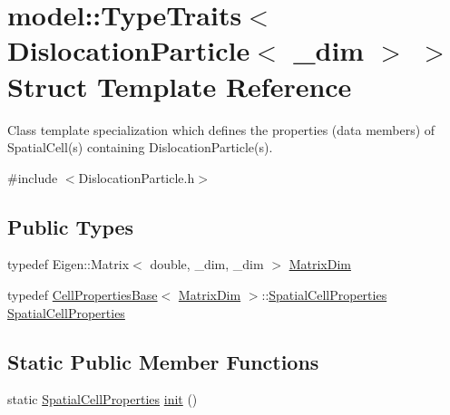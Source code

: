 \hypertarget{structmodel_1_1_type_traits_3_01_dislocation_particle_3_01__dim_01_4_01_4}{}\section{model\+:\+:Type\+Traits$<$ Dislocation\+Particle$<$ \+\_\+dim $>$ $>$ Struct Template Reference}
\label{structmodel_1_1_type_traits_3_01_dislocation_particle_3_01__dim_01_4_01_4}


Class template specialization which defines the properties (data members) of Spatial\+Cell(s) containing Dislocation\+Particle(s).  




{\ttfamily \#include $<$Dislocation\+Particle.\+h$>$}

\subsection*{Public Types}
\begin{DoxyCompactItemize}
\item 
typedef Eigen\+::\+Matrix$<$ double, \+\_\+dim, \+\_\+dim $>$ \hyperlink{structmodel_1_1_type_traits_3_01_dislocation_particle_3_01__dim_01_4_01_4_a4c1e76161c4bb074e8c6c91e13d4b15b}{Matrix\+Dim}
\item 
typedef \hyperlink{structmodel_1_1_cell_properties_base}{Cell\+Properties\+Base}$<$ \hyperlink{structmodel_1_1_type_traits_3_01_dislocation_particle_3_01__dim_01_4_01_4_a4c1e76161c4bb074e8c6c91e13d4b15b}{Matrix\+Dim} $>$\+::\hyperlink{structmodel_1_1_type_traits_3_01_dislocation_particle_3_01__dim_01_4_01_4_a1b88c1eb32da1009c672f388a3a38fc9}{Spatial\+Cell\+Properties} \hyperlink{structmodel_1_1_type_traits_3_01_dislocation_particle_3_01__dim_01_4_01_4_a1b88c1eb32da1009c672f388a3a38fc9}{Spatial\+Cell\+Properties}
\end{DoxyCompactItemize}
\subsection*{Static Public Member Functions}
\begin{DoxyCompactItemize}
\item 
static \hyperlink{structmodel_1_1_type_traits_3_01_dislocation_particle_3_01__dim_01_4_01_4_a1b88c1eb32da1009c672f388a3a38fc9}{Spatial\+Cell\+Properties} \hyperlink{structmodel_1_1_type_traits_3_01_dislocation_particle_3_01__dim_01_4_01_4_a01e31403ebc638ce0fcb11dc977ba915}{init} ()
\end{DoxyCompactItemize}


